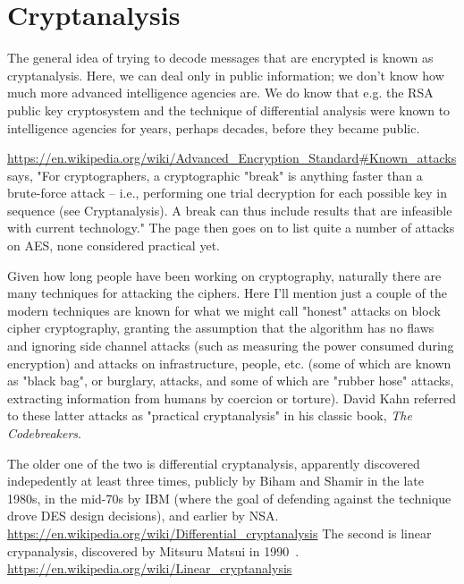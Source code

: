 \section{Cryptanalysis}
\label{sec:cryptan}


The general idea of trying to decode messages that are encrypted is
known as cryptanalysis.  Here, we can deal only in public information;
we don't know how much more advanced intelligence agencies are.  We do
know that e.g. the RSA public key cryptosystem and the technique of
differential analysis were known to intelligence agencies for years,
perhaps decades, before they became public. 

\url{https://en.wikipedia.org/wiki/Advanced_Encryption_Standard#Known_attacks}
says, "For cryptographers, a cryptographic "break" is anything faster
than a brute-force attack – i.e., performing one trial decryption for
each possible key in sequence (see Cryptanalysis). A break can thus
include results that are infeasible with current technology."
The page then goes on to list quite a number of attacks on AES, none
considered practical yet.

Given how long people have been working on cryptography, naturally
there are many techniques for attacking the ciphers.  Here I'll
mention just a couple of the modern techniques are known for what we
might call "honest" attacks on block cipher cryptography, granting the
assumption that the algorithm has no flaws and ignoring side channel
attacks (such as measuring the power consumed during encryption) and
attacks on infrastructure, people, etc. (some of which are known as
"black bag", or burglary, attacks, and some of which are "rubber hose"
attacks, extracting information from humans by coercion or torture).
David Kahn referred to these latter attacks as "practical
cryptanalysis" in his classic book, \emph{The Codebreakers}.

The older one of the two is differential cryptanalysis, apparently
discovered indepedently at least three times, publicly by Biham and
Shamir in the late 1980s, in the mid-70s by IBM (where the goal of
defending against the technique drove DES design decisions), and
earlier by NSA.
\url{https://en.wikipedia.org/wiki/Differential_cryptanalysis}
The second is linear crypanalysis, discovered by Mitsuru Matsui in
1990~\cite{matsui1993linear}.
\url{https://en.wikipedia.org/wiki/Linear_cryptanalysis}

